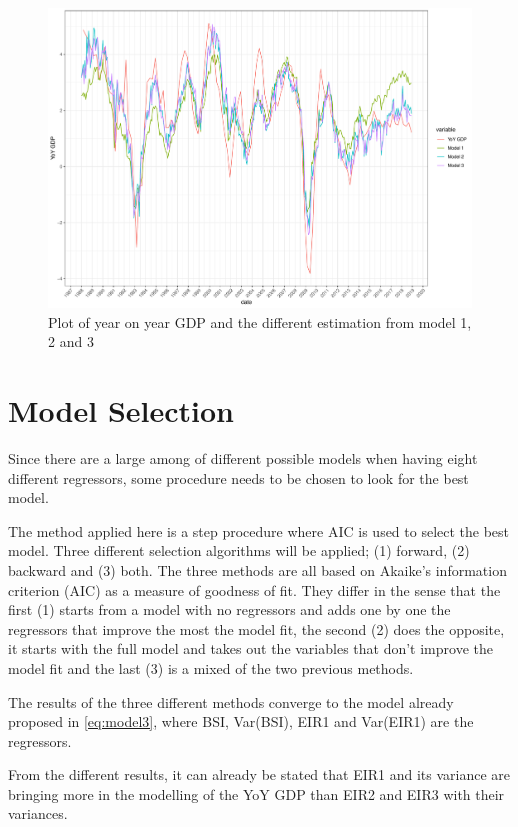 \documentclass[12pt,a4paper,oneside]{book}
\begin{document}
\begin{figure}[!htbp]
    \centering
    \includegraphics[scale=0.5]{Graphs/predictions1.pdf}
    \caption{Plot of year on year GDP and the different estimation from model 1, 2 and 3}
    \label{fig:predictions1}
\end{figure}



\section{Model Selection}

Since there are a large among of different possible models when having eight different regressors, some procedure needs to be chosen to look for the best model.

The method applied here is a step procedure where AIC is used to select the best model.
Three different selection algorithms will be applied; (1) forward, (2) backward and  (3) both. 
The three methods are all based on Akaike's information criterion (AIC) as a measure of goodness of fit. They differ in the sense that the first (1) starts from a model with no regressors and adds one by one the regressors that improve the most the model fit, the second (2) does the opposite, it starts with the full model and takes out the variables that don't improve the model fit and the last (3) is a mixed of the two previous methods.

The results of the three different methods converge to the model already proposed in \autoref{eq:model3}, where BSI, Var(BSI), EIR1 and Var(EIR1) are the regressors.

From the different results, it can already be stated that EIR1 and its variance are bringing more in the modelling of the YoY GDP than EIR2 and EIR3 with their variances.
\end{document}
